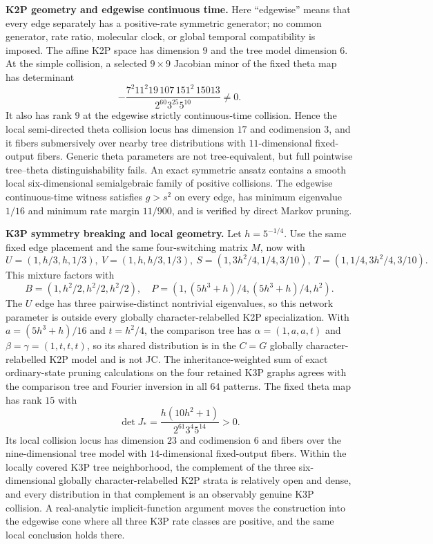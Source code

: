 \documentclass[10pt]{article}
\begin{document}
\newpage
\textbf{K2P geometry and edgewise continuous time.} Here ``edgewise'' means that every edge separately has a positive-rate symmetric generator; no common generator, rate ratio, molecular clock, or global temporal compatibility is imposed. The affine K2P space has dimension $9$ and the tree model dimension $6$. At the simple collision, a selected $9\times9$ Jacobian minor of the fixed theta map has determinant
\[
-\frac{7^2 11^2 19\,107\,151^2\,15013}{2^{60}3^{25}5^{10}}\ne0.
\]
It also has rank $9$ at the edgewise strictly continuous-time collision. Hence the local semi-directed theta collision locus has dimension $17$ and codimension $3$, and it fibers submersively over nearby tree distributions with $11$-dimensional fixed-output fibers. Generic theta parameters are not tree-equivalent, but full pointwise tree--theta distinguishability fails. An exact symmetric ansatz contains a smooth local six-dimensional semialgebraic family of positive collisions. The edgewise continuous-time witness satisfies $g>s^2$ on every edge, has minimum eigenvalue $1/16$ and minimum rate margin $11/900$, and is verified by direct Markov pruning.

\textbf{K3P symmetry breaking and local geometry.} Let $h=5^{-1/4}$. Use the same fixed edge placement and the same four-switching matrix $M$, now with
\[
U=(1,h/3,h,1/3),\ V=(1,h,h/3,1/3),\ S=(1,3h^2/4,1/4,3/10),\ T=(1,1/4,3h^2/4,3/10).
\]
This mixture factors with
\[
B=(1,h^2/2,h^2/2,h^2/2),\quad P=(1,(5h^3+h)/4,(5h^3+h)/4,h^2).
\]
The $U$ edge has three pairwise-distinct nontrivial eigenvalues, so this network parameter is outside every globally character-relabelled K2P specialization. With $a=(5h^3+h)/16$ and $t=h^2/4$, the comparison tree has $\alpha=(1,a,a,t)$ and $\beta=\gamma=(1,t,t,t)$, so its shared distribution is in the $C=G$ globally character-relabelled K2P model and is not JC. The inheritance-weighted sum of exact ordinary-state pruning calculations on the four retained K3P graphs agrees with the comparison tree and Fourier inversion in all $64$ patterns. The fixed theta map has rank $15$ with
\[
\det J_*=\frac{h(10h^2+1)}{2^{61}3^4 5^{14}}>0.
\]
Its local collision locus has dimension $23$ and codimension $6$ and fibers over the nine-dimensional tree model with $14$-dimensional fixed-output fibers. Within the locally covered K3P tree neighborhood, the complement of the three six-dimensional globally character-relabelled K2P strata is relatively open and dense, and every distribution in that complement is an observably genuine K3P collision. A real-analytic implicit-function argument moves the construction into the edgewise cone where all three K3P rate classes are positive, and the same local conclusion holds there.
\end{document}
